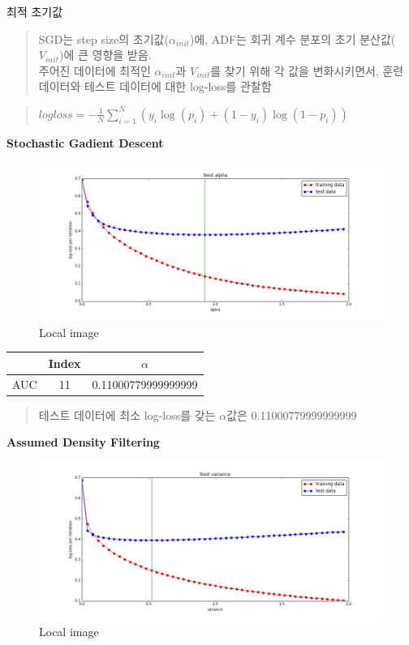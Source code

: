 \documentclass[11pt]{article}
\makeatletter
\def\maxwidth{\ifdim\Gin@nat@width>\linewidth\linewidth
    \else\Gin@nat@width\fi}
\let\Oldincludegraphics\includegraphics
\renewcommand{\includegraphics}[1]{\Oldincludegraphics[width=.8\maxwidth]{#1}}
\makeatother
\begin{document}
    최적 초기값

    \begin{quote}
SGD는 step size의 초기값(\(\alpha_{init}\))에, ADF는 회귀 계수 분포의
초기 분산값(\(V_{init}\))에 큰 영향을 받음.\\
주어진 데이터에 최적인 \(\alpha_{init}\)과 \(V_{init}\)를 찾기 위해 각
값을 변화시키면서, 훈련 데이터와 테스트 데이터에 대한 log-loss를 관찰함
\end{quote}

    \begin{quote}
\(logloss = -\frac{1}{N}\sum_{i=1}^N {(y_i\log(p_i) + (1 - y_i)\log(1 - p_i))}\)
\end{quote}

    \textbf{Stochastic Gadient Descent}

    \begin{figure}[htbp]
\centering
\includegraphics{./images/best_param_sgd_T.png}
\caption{Local image}
\end{figure}

    \begin{longtable}[]{@{}lcc@{}}
\toprule
& Index & \(\alpha\)\tabularnewline
\midrule
\endhead
AUC & 11 & 0.11000779999999999\tabularnewline
\bottomrule
\end{longtable}

    \begin{quote}
테스트 데이터에 최소 log-loss를 갖는 \(\alpha\)값은 0.11000779999999999
\end{quote}

    \textbf{Assumed Density Filtering}

    \begin{figure}[htbp]
\centering
\includegraphics{./images/best_param_adf_T.png}
\caption{Local image}
\end{figure}
\end{document}

